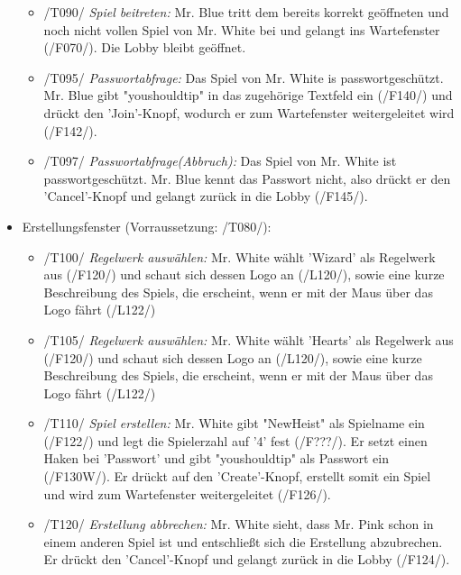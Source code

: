 \documentclass{article}
\begin{document}
\begin{itemize}
\begin{itemize}
		\item /T090/ \textit{Spiel beitreten:} Mr. Blue tritt dem bereits korrekt geöffneten und noch nicht vollen Spiel von Mr. White bei und gelangt ins Wartefenster (/F070/). Die Lobby bleibt geöffnet.
		
		\item /T095/ \textit{Passwortabfrage:} Das Spiel von Mr. White is passwortgeschützt. Mr. Blue gibt "youshouldtip" in das zugehörige Textfeld ein (/F140/) und drückt den 'Join'-Knopf, wodurch er zum Wartefenster weitergeleitet wird (/F142/). 
		
		\item /T097/ \textit{Passwortabfrage(Abbruch):} Das Spiel von Mr. White ist passwortgeschützt. Mr. Blue kennt das Passwort nicht, also drückt er den 'Cancel'-Knopf und gelangt zurück in die Lobby (/F145/).
			  
	\end{itemize}
	
	\item Erstellungsfenster (Vorraussetzung: /T080/): 
	
	\begin{itemize}
	
		\item /T100/ \textit{Regelwerk auswählen:} Mr. White wählt 'Wizard' als Regelwerk aus (/F120/) und schaut sich dessen Logo an (/L120/), sowie eine kurze Beschreibung des Spiels, die erscheint, wenn er mit der Maus über das Logo fährt (/L122/)
		
		\item /T105/ \textit{Regelwerk auswählen:} Mr. White wählt 'Hearts' als Regelwerk aus (/F120/) und schaut sich dessen Logo an (/L120/), sowie eine kurze Beschreibung des Spiels, die erscheint, wenn er mit der Maus über das Logo fährt (/L122/)
		
		\item /T110/ \textit{Spiel erstellen:} Mr. White gibt "NewHeist" als Spielname ein (/F122/) und legt die Spielerzahl auf '4' fest (/F???/). Er setzt einen Haken bei 'Passwort' und gibt "youshouldtip" als Passwort ein (/F130W/). Er drückt auf den 'Create'-Knopf, erstellt somit ein Spiel und wird zum Wartefenster weitergeleitet (/F126/).
		
		\item /T120/ \textit{Erstellung abbrechen:} Mr. White sieht, dass Mr. Pink schon in einem anderen Spiel ist und entschließt sich die Erstellung abzubrechen. Er drückt den 'Cancel'-Knopf und gelangt zurück in die Lobby (/F124/).
	

\end{itemize}
\end{itemize}
\end{document}
